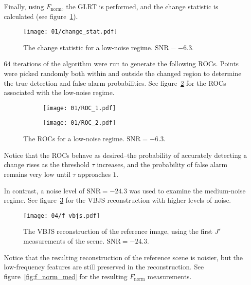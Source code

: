 \documentclass{article}
\begin{document}
Finally, using $F_\text{norm}$, the GLRT is performed, and the change statistic is calculated (see figure~\ref{fig:change_stat}).

\begin{figure}[H]
   \centering
   \texttt{[image: 01/change\_stat.pdf]}
   \caption{The change statistic for a low-noise regime. $\text{SNR} = -6.3$.}
   \label{fig:change_stat}
\end{figure}

$64$ iterations of the algorithm were run to generate the following ROCs. Points were picked randomly both within and outside the changed region to determine the true detection and false alarm probabilities. See figure~\ref{fig:roc_01} for the ROCs associated with the low-noise regime.

\begin{figure}[H]
   \centering
   \begin{subfigure}{0.5\textwidth}
       \centering
       \texttt{[image: 01/ROC\_1.pdf]}
   \end{subfigure}%
   \begin{subfigure}{0.5\textwidth}
       \centering
       \texttt{[image: 01/ROC\_2.pdf]}
   \end{subfigure}%
   \caption{The ROCs for a low-noise regime. $\text{SNR} = -6.3$.}
   \label{fig:roc_01}
\end{figure}

Notice that the ROCs behave as desired--the probability of accurately detecting a change rises as the threshold $\tau$ increases, and the probability of false alarm remains very low until $\tau$ approaches $1$.

In contrast, a noise level of $\text{SNR} = -24.3$ was used to examine the medium-noise regime. See figure~\ref{fig:f_vbjs_med} for the VBJS reconstruction with higher levels of noise.

\begin{figure}[H]
   \centering
   \texttt{[image: 04/f\_vbjs.pdf]}
   \caption{The VBJS reconstruction of the reference image, using the first $J'$ measurements of the scene. $\text{SNR} = -24.3$.}
   \label{fig:f_vbjs_med}
\end{figure}

Notice that the resulting reconstruction of the reference scene is noisier, but the low-frequency features are still preserved in the reconstruction. See figure~\ref{fig:f_norm_med} for the resulting $F_\text{norm}$ measurements.
\end{document}
